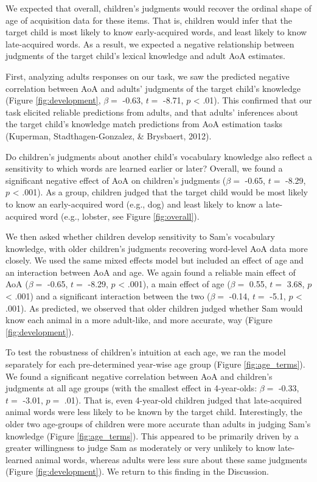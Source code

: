 \documentclass[10pt, letterpaper]{article}
\begin{document}
We expected that overall, children's judgments would recover the ordinal
shape of age of acquisition data for these items. That is, children
would infer that the target child is most likely to know early-acquired
words, and least likely to know late-acquired words. As a result, we
expected a negative relationship between judgments of the target child's
lexical knowledge and adult AoA estimates.

First, analyzing adults responses on our task, we saw the predicted
negative correlation between AoA and adults' judgments of the target
child's knowledge (Figure \ref{fig:development}, \(\beta =\) -0.63,
\(t =\) -8.71, \(p\) \textless{} .01). This confirmed that our task
elicited reliable predictions from adults, and that adults' inferences
about the target child's knowledge match predictions from AoA estimation
tasks (Kuperman, Stadthagen-Gonzalez, \& Brysbaert, 2012).

Do children's judgments about another child's vocabulary knowledge also
reflect a sensitivity to which words are learned earlier or later?
Overall, we found a significant negative effect of AoA on children's
judgments (\(\beta =\) -0.65, \(t =\) -8.29, \(p\) \textless{} .001). As
a group, children judged that the target child would be most likely to
know an early-acquired word (e.g., dog) and least likely to know a
late-acquired word (e.g., lobster, see Figure \ref{fig:overall}).

We then asked whether children develop sensitivity to Sam's vocabulary
knowledge, with older children's judgments recovering word-level AoA
data more closely. We used the same mixed effects model but included an
effect of age and an interaction between AoA and age. We again found a
reliable main effect of AoA (\(\beta =\) -0.65, \(t =\) -8.29, \(p\)
\textless{} .001), a main effect of age (\(\beta =\) 0.55, \(t =\) 3.68,
\(p\) \textless{} .001) and a significant interaction between the two
(\(\beta =\) -0.14, \(t =\) -5.1, \(p\) \textless{} .001). As predicted,
we observed that older children judged whether Sam would know each
animal in a more adult-like, and more accurate, way (Figure
\ref{fig:development}).

To test the robustness of children's intuition at each age, we ran the
model separately for each pre-determined year-wise age group (Figure
\ref{fig:age_terms}). We found a significant negative correlation
between AoA and children's judgments at all age groups (with the
smallest effect in 4-year-olds: \(\beta =\) -0.33, \(t =\) -3.01,
\(p =\) .01). That is, even 4-year-old children judged that
late-acquired animal words were less likely to be known by the target
child. Interestingly, the older two age-groups of children were more
accurate than adults in judging Sam's knowledge (Figure
\ref{fig:age_terms}). This appeared to be primarily driven by a greater
willingness to judge Sam as moderately or very unlikely to know
late-learned animal words, whereas adults were less sure about these
same judgments (Figure \ref{fig:development}). We return to this finding
in the Discussion.
\end{document}
